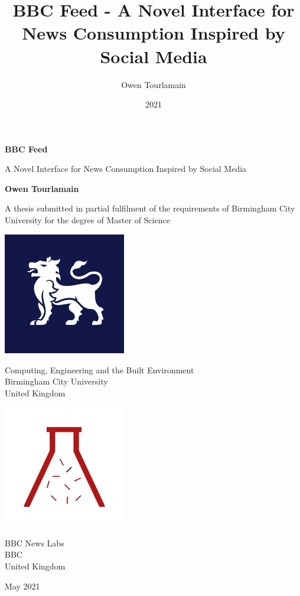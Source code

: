 \documentclass[12pt,titlepage]{article}
\title{BBC Feed - A Novel Interface for News Consumption Inspired by Social Media}
\date{2021}
\author{Owen Tourlamain}
\begin{document}
\begin{titlepage}
	\begin{center}
		\vspace*{1cm}

		\begingroup
      \fontsize{24}{30}\selectfont
      \textbf{BBC Feed}
    \endgroup

    \begingroup
      \fontsize{18}{22}\selectfont
      A Novel Interface for News Consumption Inspired by Social Media
    \endgroup

		\vspace{2cm}

		\textbf{Owen Tourlamain}

		\vfill

		A thesis submitted in partial fulfilment of the requirements of Birmingham City University for the degree of Master of Science

		\vspace{0.8cm}

    \begin{multicols}{2}

		\includegraphics[width=0.4\textwidth]{../img/bcu.jpg}

		Computing, Engineering and the Built Environment\\
		Birmingham City University\\
		United Kingdom\\
    \columnbreak

    \includegraphics[width=0.4\textwidth]{../img/bbcnl.jpg}

		BBC News Labs\\
		BBC\\
		United Kingdom\\

    \end{multicols}

    May 2021

	\end{center}
\end{titlepage}
\end{document}
